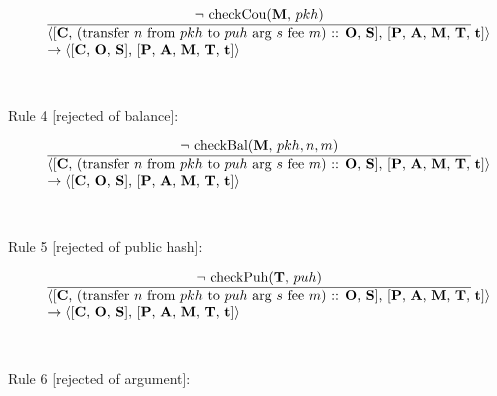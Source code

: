 \documentclass[a4paper]{llncs}
\begin{document}
\begin{equation}{}
\frac{\text{$\neg$ checkCou(\MANAGERS, $pkh$)}}{\parbox{4.2in}{\text{$\langle$[\ACCOUNTS, (transfer ${n}$ from ${pkh}$ to  ${puh}$ arg ${s}$ fee ${m}$) :: \OPERATIONS, \CONTRACTS], [\PENDING, \ACCEPTED, \MANAGERS, \CONTRACTORS, \TIME]$\rangle$  }\\
\text{$\rightarrow \langle$[\ACCOUNTS, \OPERATIONS, \CONTRACTS], [\PENDING, \ACCEPTED, \MANAGERS, \CONTRACTORS, \TIME]$\rangle$}}} 
\end{equation}
~\\
~\\
Rule 4 [rejected of balance]:

\begin{equation}{}
\frac{\text{$\neg$ checkBal(\MANAGERS, $pkh, n, m$)}}{\parbox{4.2in}{\text{$\langle$[\ACCOUNTS, (transfer ${n}$ from ${pkh}$ to  ${puh}$ arg ${s}$ fee ${m}$) :: \OPERATIONS, \CONTRACTS], [\PENDING, \ACCEPTED, \MANAGERS, \CONTRACTORS, \TIME]$\rangle$ }\\
\text{$\rightarrow \langle$[\ACCOUNTS, \OPERATIONS, \CONTRACTS], [\PENDING, \ACCEPTED, \MANAGERS, \CONTRACTORS, \TIME]$\rangle$}}} 
\end{equation}
~\\
~\\
Rule 5 [rejected of public hash]:

\begin{equation}{}
\frac{\text{$\neg$ checkPuh(\CONTRACTORS, $puh$)}}{\parbox{4.2in}{\text{$\langle$[\ACCOUNTS, (transfer ${n}$ from ${pkh}$ to  ${puh}$ arg ${s}$ fee ${m}$) :: \OPERATIONS, \CONTRACTS], [\PENDING, \ACCEPTED, \MANAGERS, \CONTRACTORS, \TIME]$\rangle$ }\\
\text{$\rightarrow \langle$[\ACCOUNTS, \OPERATIONS, \CONTRACTS], [\PENDING, \ACCEPTED, \MANAGERS, \CONTRACTORS, \TIME]$\rangle$}}} 
\end{equation}
~\\
~\\
Rule 6 [rejected of argument]:
\end{document}
